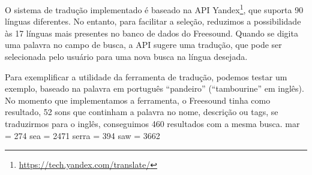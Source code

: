 O sistema de tradução implementado é baseado na API Yandex\footnote{\url{https://tech.yandex.com/translate/}}, que suporta 90 línguas diferentes. No entanto, para facilitar a seleção, reduzimos a possibilidade às 17 línguas mais presentes no banco de dados do Freesound. Quando se digita uma palavra no campo de busca, a API sugere uma tradução, que pode ser selecionada pelo usuário para uma nova busca na língua desejada.

Para exemplificar a utilidade da ferramenta de tradução, podemos testar um exemplo, baseado na palavra em português ``pandeiro'' (``tambourine'' em inglês). No momento que implementamos a ferramenta, o Freesound tinha como resultado, 52 sons que continham a palavra no nome, descrição ou tags, se traduzirmos para o inglês, conseguimos 460 resultados com a mesma busca. mar = 274 sea = 2471
serra = 394
saw = 3662





